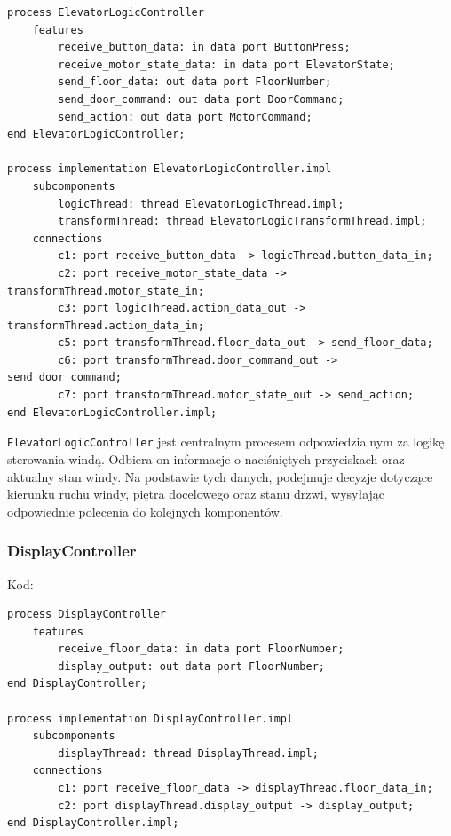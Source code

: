 \documentclass{article}
\begin{document}
    \begin{lstlisting}[basicstyle=\ttfamily, keywordstyle=\bfseries]
process ElevatorLogicController
    features
        receive_button_data: in data port ButtonPress;
        receive_motor_state_data: in data port ElevatorState;
        send_floor_data: out data port FloorNumber;
        send_door_command: out data port DoorCommand;
        send_action: out data port MotorCommand;
end ElevatorLogicController;

process implementation ElevatorLogicController.impl
    subcomponents
        logicThread: thread ElevatorLogicThread.impl;
        transformThread: thread ElevatorLogicTransformThread.impl;
    connections
        c1: port receive_button_data -> logicThread.button_data_in;
        c2: port receive_motor_state_data -> transformThread.motor_state_in;
        c3: port logicThread.action_data_out -> transformThread.action_data_in;
        c5: port transformThread.floor_data_out -> send_floor_data;
        c6: port transformThread.door_command_out -> send_door_command;
        c7: port transformThread.motor_state_out -> send_action; 
end ElevatorLogicController.impl;
    \end{lstlisting}

    \texttt{ElevatorLogicController}  jest centralnym procesem odpowiedzialnym za logikę sterowania windą. Odbiera on informacje o naciśniętych przyciskach oraz aktualny stan windy. Na podstawie tych danych, podejmuje decyzje dotyczące kierunku ruchu windy, piętra docelowego oraz stanu drzwi, wysyłając odpowiednie polecenia do kolejnych komponentów.





    \subsubsection{DisplayController}

    Kod:
    
    \begin{lstlisting}[basicstyle=\ttfamily, keywordstyle=\bfseries]
process DisplayController
    features
        receive_floor_data: in data port FloorNumber;
        display_output: out data port FloorNumber;
end DisplayController;

process implementation DisplayController.impl
    subcomponents
        displayThread: thread DisplayThread.impl;
    connections
        c1: port receive_floor_data -> displayThread.floor_data_in;
        c2: port displayThread.display_output -> display_output;
end DisplayController.impl;
    \end{lstlisting}
\end{document}
